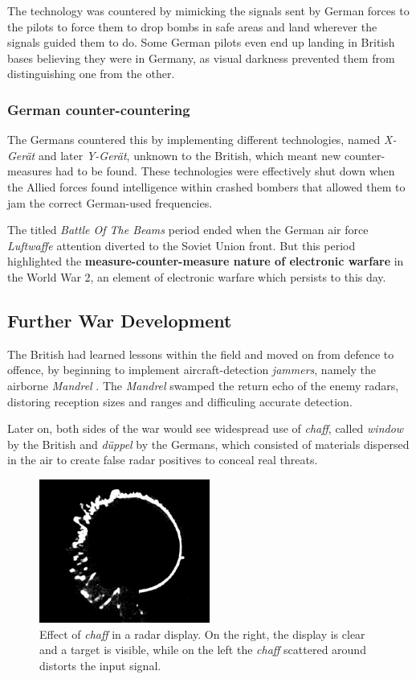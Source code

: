 \documentclass[english,purist]{ist-report}
\begin{document}
The technology was countered by mimicking the signals sent by German forces to the pilots to force them to drop bombs in safe areas and land wherever the signals guided them to do. Some German pilots even end up landing in British bases believing they were in Germany, as visual darkness prevented them from distinguishing one from the other.

\subsubsection{German counter-countering}

The Germans countered this by implementing different technologies, named \textit{X-Gerät} and later \textit{Y-Gerät}, unknown to the British, which meant new counter-measures had to be found. These technologies were effectively shut down when the Allied forces found intelligence within crashed bombers that allowed them to jam the correct German-used frequencies.

The titled \textit{Battle Of The Beams} period ended when the German air force \textit{Luftwaffe} attention diverted to the Soviet Union front. But this period highlighted the \textbf{measure-counter-measure nature of electronic warfare} in the World War 2, an element of electronic warfare which persists to this day.

\subsection{Further War Development}

The British had learned lessons within the field and moved on from defence to offence, by beginning to implement aircraft-detection \textit{jammers}, namely the airborne \textit{Mandrel} \cite{alican2006}. The \textit{Mandrel} swamped the return echo of the enemy radars, distoring reception sizes and ranges and difficuling accurate detection.

Later on, both sides of the war would see widespread use of \textit{chaff}, called \textit{window} by the British and \textit{düppel} by the Germans, which consisted of materials dispersed in the air to create false radar positives to conceal real threats.
\begin{figure}[ht]
    \centering
    \includegraphics[width = 0.5\textwidth]{chaff}
    \caption{Effect of \textit{chaff} in a radar display. On the right, the display is clear and a target is visible, while on the left the \textit{chaff} scattered around distorts the input signal.}
    \label{fig:chaff}
\end{figure}
\end{document}

